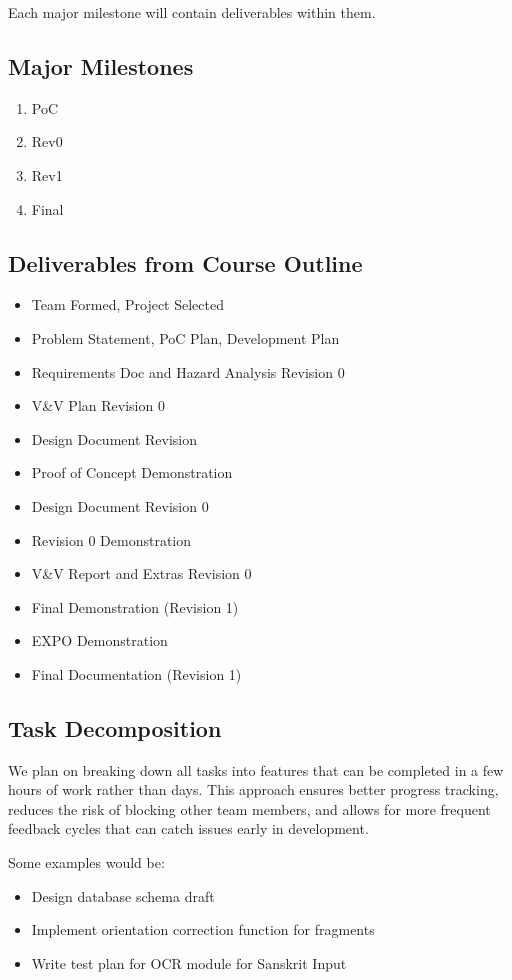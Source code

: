 \documentclass{article}
\begin{document}
\noindent
Each major milestone will contain deliverables within them.

\subsection*{Major Milestones}
\begin{enumerate}
    \item PoC
    \item Rev0
    \item Rev1
    \item Final
\end{enumerate}

\subsection*{Deliverables from Course Outline}
\begin{itemize}
    \item Team Formed, Project Selected
    \item Problem Statement, PoC Plan, Development Plan
    \item Requirements Doc and Hazard Analysis Revision 0
    \item V\&V Plan Revision 0
    \item Design Document Revision 
    \item Proof of Concept Demonstration
    \item Design Document Revision 0
    \item Revision 0 Demonstration
    \item V\&V Report and Extras Revision 0
    \item Final Demonstration (Revision 1)
    \item EXPO Demonstration
    \item Final Documentation (Revision 1)
\end{itemize}

\subsection*{Task Decomposition}
We plan on breaking down all tasks into features that can be completed in a few hours of work rather than days. This approach ensures better progress tracking, reduces the risk of blocking other team members, and allows for more frequent feedback cycles that can catch issues early in development. 

Some examples would be:
\begin{itemize}
    \item Design database schema draft
    \item Implement orientation correction function for fragments
    \item Write test plan for OCR module for Sanskrit Input
\end{itemize}
\end{document}
